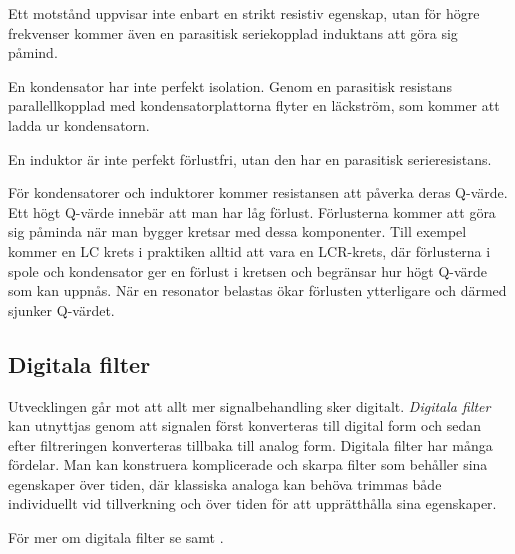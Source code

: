 Ett motstånd uppvisar inte enbart en strikt resistiv egenskap, utan för högre
frekvenser kommer även en parasitisk seriekopplad induktans att göra sig påmind.

En kondensator har inte perfekt isolation.
Genom en parasitisk resistans parallellkopplad med kondensatorplattorna flyter
en läckström, som kommer att ladda ur kondensatorn.

En induktor är inte perfekt förlustfri, utan den har en parasitisk serieresistans.

För kondensatorer och induktorer kommer resistansen att påverka deras Q-värde.
Ett högt Q-värde innebär att man har låg förlust.
Förlusterna kommer att göra sig påminda när man bygger kretsar med dessa
komponenter.
Till exempel kommer en LC krets i praktiken alltid att vara en LCR-krets, där
förlusterna i spole och kondensator ger en förlust i kretsen och begränsar hur
högt Q-värde som kan uppnås.
När en resonator belastas ökar förlusten ytterligare och därmed sjunker Q-värdet.


\subsection{Digitala filter}

Utvecklingen går mot att allt mer signalbehandling sker digitalt. 
\emph{Digitala filter} kan utnyttjas genom att signalen först konverteras till
digital form och sedan efter filtreringen konverteras tillbaka till analog form.
Digitala filter har många fördelar.
Man kan konstruera komplicerade och skarpa filter som behåller sina egenskaper
över tiden, där klassiska analoga kan behöva trimmas både individuellt vid
tillverkning och över tiden för att upprätthålla sina egenskaper.

För mer om digitala filter se  samt .
